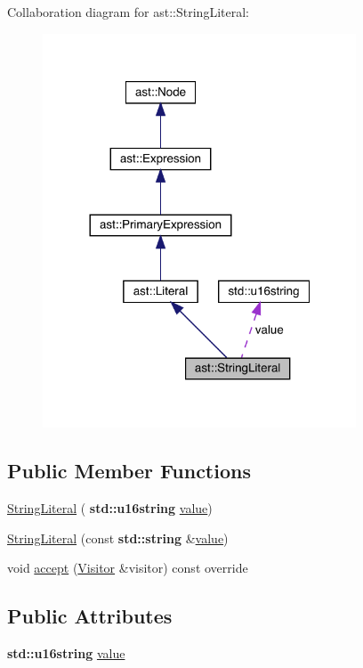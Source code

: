 Collaboration diagram for ast\+:\+:String\+Literal\+:\nopagebreak
\begin{figure}[H]
\begin{center}
\leavevmode
\includegraphics[width=264pt]{structast_1_1_string_literal__coll__graph}
\end{center}
\end{figure}
\subsection*{Public Member Functions}
\begin{DoxyCompactItemize}
\item 
\hyperlink{structast_1_1_string_literal_a4584a1a513c8e6827d874bc8cbd5e040}{String\+Literal} (\textbf{ std\+::u16string} \hyperlink{structast_1_1_string_literal_ae29e252908fc00142e9b79371795a2e5}{value})
\item 
\hyperlink{structast_1_1_string_literal_aebc9195c9b488b10378322fcd2fd69e4}{String\+Literal} (const \textbf{ std\+::string} \&\hyperlink{structast_1_1_string_literal_ae29e252908fc00142e9b79371795a2e5}{value})
\item 
void \hyperlink{structast_1_1_string_literal_abf4cae9ed97b2f9b9cf92f2a06f1ec74}{accept} (\hyperlink{structast_1_1_visitor}{Visitor} \&visitor) const override
\end{DoxyCompactItemize}
\subsection*{Public Attributes}
\begin{DoxyCompactItemize}
\item 
\textbf{ std\+::u16string} \hyperlink{structast_1_1_string_literal_ae29e252908fc00142e9b79371795a2e5}{value}
\end{DoxyCompactItemize}


